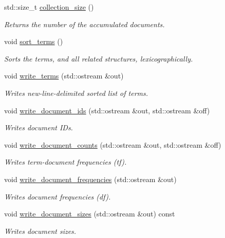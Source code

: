 \begin{DoxyCompactItemize}
std\+::size\+\_\+t \mbox{\hyperlink{classirk_1_1index__builder_a1acc084abede3f0d143448f9c0f96b7b}{collection\+\_\+size}} ()
\begin{DoxyCompactList}\small\item\em Returns the number of the accumulated documents. \end{DoxyCompactList}\item 
void \mbox{\hyperlink{classirk_1_1index__builder_ad89b04727675b0fc56e91bbe9114e942}{sort\+\_\+terms}} ()
\begin{DoxyCompactList}\small\item\em Sorts the terms, and all related structures, lexicographically. \end{DoxyCompactList}\item 
void \mbox{\hyperlink{classirk_1_1index__builder_a7bd993ab3ceb6527e622187bde86c93a}{write\+\_\+terms}} (std\+::ostream \&out)
\begin{DoxyCompactList}\small\item\em Writes new-\/line-\/delimited sorted list of terms. \end{DoxyCompactList}\item 
void \mbox{\hyperlink{classirk_1_1index__builder_adcb91466aff37e3fe77b400bffdadfbe}{write\+\_\+document\+\_\+ids}} (std\+::ostream \&out, std\+::ostream \&off)
\begin{DoxyCompactList}\small\item\em Writes document I\+Ds. \end{DoxyCompactList}\item 
void \mbox{\hyperlink{classirk_1_1index__builder_a69082abb251ed664e6ba7550995c8cf6}{write\+\_\+document\+\_\+counts}} (std\+::ostream \&out, std\+::ostream \&off)
\begin{DoxyCompactList}\small\item\em Writes term-\/document frequencies (tf). \end{DoxyCompactList}\item 
void \mbox{\hyperlink{classirk_1_1index__builder_a10f84fb4c00cea77259d275fc47635ed}{write\+\_\+document\+\_\+frequencies}} (std\+::ostream \&out)
\begin{DoxyCompactList}\small\item\em Writes document frequencies (df). \end{DoxyCompactList}\item 
void \mbox{\hyperlink{classirk_1_1index__builder_a734a12d7e31414de11758e18c24010b2}{write\+\_\+document\+\_\+sizes}} (std\+::ostream \&out) const
\begin{DoxyCompactList}\small\item\em Writes document sizes. \end{DoxyCompactList}\item 

\end{DoxyCompactItemize}
